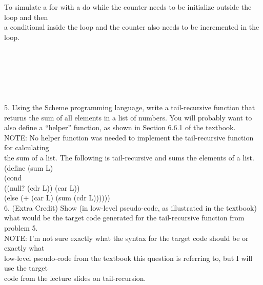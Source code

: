 \documentclass[12pt]{article}
\begin{document}
\begin{flushleft}
\qquad To simulate a {\selectfont for} with a {\selectfont do while} the counter needs to be initialize outside the loop and then\\
\qquad a conditional inside the loop and the counter also needs to be incremented in the loop.\\
[2mm]

\qquad {}\\
\qquad {}\\
\qquad \qquad {}\\
\qquad \qquad \qquad {}\\
\qquad \qquad \qquad {}\\
\qquad {}\\
[6mm]

5. Using the Scheme programming language, write a tail-recursive function that returns
the sum of all elements in a list of numbers. You will probably want to also define a “helper”
function, as shown in Section 6.6.1 of the textbook.\\
[2mm]

\qquad NOTE: No helper function was needed to implement the tail-recursive function for calculating\\
\qquad the sum of a list.  The following is tail-recursive and sums the elements of a list.\\
[2mm]

\qquad (define (sum L)\\
\qquad \qquad \qquad (cond\\
\qquad \qquad \qquad ((null? (cdr L)) (car L))\\
\qquad \qquad \qquad (else (+ (car L) (sum (cdr L))))))\\
[20mm] 

6. (Extra Credit) Show (in low-level pseudo-code, as illustrated in the textbook) what
would be the target code generated for the tail-recursive function from problem 5.\\
[2mm]

\qquad NOTE: I'm not sure exactly what the syntax for the target code should be or exactly what\\
\qquad low-level pseudo-code from the textbook this question is referring to, but I will use the target\\
\qquad code from the lecture slides on tail-recursion.\\
[2mm]


\end{flushleft}
\end{document}
